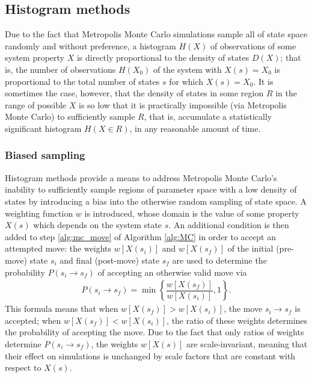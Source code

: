 \documentclass[11pt]{article}
\newcommand{\f}[2]{\dfrac{#1}{#2}} %
\newcommand{\p}[1]{\left(#1\right)} %
\renewcommand{\sp}[1]{\left[#1\right]} %
\renewcommand{\set}[1]{\left\{#1\right\}} %
\begin{document}
\subsection{Histogram methods}
\label{sec:histogram_methods}

Due to the fact that Metropolis Monte Carlo simulations sample all of
state space randomly and without preference, a histogram $H\p{X}$ of
observations of some system property $X$ is directly proportional to
the density of states $D\p{X}$; that is, the number of observations
$H\p{X_0}$ of the system with $X\p{s}=X_0$ is proportional to the
total number of states $s$ for which $X\p{s}=X_0$. It is sometimes the
case, however, that the density of states in some region $R$ in the
range of possible $X$ is so low that it is practically impossible (via
Metropolis Monte Carlo) to sufficiently sample $R$, that is,
accumulate a statistically significant histogram $H\p{X\in R}$, in any
reasonable amount of time.

\subsubsection{Biased sampling}
\label{sec:biased_sampling}

Histogram methods provide a means to address Metropolis Monte Carlo's
inability to sufficiently sample regions of parameter space with a low
density of states by introducing a bias into the otherwise random
sampling of state space. A weighting function $w$ is introduced, whose
domain is the value of some property $X\p{s}$ which depends on the
system state $s$. An additional condition is then added to step
\ref{alg:mc_move} of Algorithm \ref{alg:MC} in order to accept an
attempted move: the weights $w\sp{X\p{s_i}}$ and $w\sp{X\p{s_f}}$ of
the initial (pre-move) state $s_i$ and final (post-move) state $s_f$
are used to determine the probability $P\p{s_i\to s_f}$ of accepting
an otherwise valid move via
\begin{align}
  P\p{s_i\to s_f}=\min\set{\f{w\sp{X\p{s_f}}}{w\sp{X\p{s_i}}},1}.
  \label{eq:move_prob}
\end{align}
This formula means that when $w\sp{X\p{s_f}}>w\sp{X\p{s_i}}$, the move
$s_i\to s_f$ is accepted; when $w\sp{X\p{s_f}}<w\sp{X\p{s_i}}$, the
ratio of these weights determines the probability of accepting the
move. Due to the fact that only ratios of weights determine
$P\p{s_i\to s_f}$, the weights $w\sp{X\p{s}}$ are scale-invariant,
meaning that their effect on simulations is unchanged by scale factors
that are constant with respect to $X\p{s}$.
\end{document}
